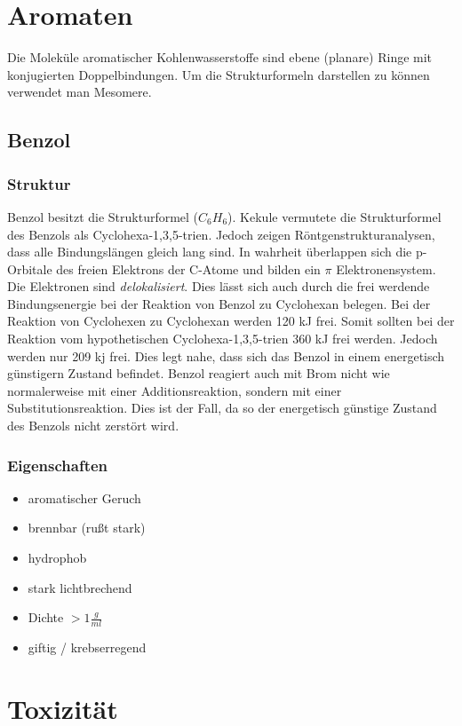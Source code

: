 \documentclass{article}
\begin{document}
\section*{Aromaten}
Die Moleküle aromatischer Kohlenwasserstoffe sind ebene (planare)
Ringe mit konjugierten Doppelbindungen. Um die Strukturformeln darstellen zu können 
verwendet man Mesomere.
\subsection*{Benzol}
\subsubsection*{Struktur}
Benzol besitzt die Strukturformel ($C_6H_6$). Kekule vermutete die Strukturformel des
Benzols als Cyclohexa-1,3,5-trien. Jedoch zeigen Röntgenstrukturanalysen, dass alle 
Bindungslängen gleich lang sind. In wahrheit überlappen sich die p-Orbitale des freien
Elektrons der C-Atome und bilden ein $\pi$ Elektronensystem. Die Elektronen sind 
\emph{delokalisiert}. Dies lässt sich auch durch die frei werdende Bindungsenergie bei
der Reaktion von Benzol zu Cyclohexan belegen. Bei der Reaktion von Cyclohexen zu 
Cyclohexan werden 120 \unit{kJ} frei. Somit sollten bei der Reaktion vom hypothetischen
Cyclohexa-1,3,5-trien 360 \unit{kJ} frei werden. Jedoch werden nur 209 \unit{kj} frei.
Dies legt nahe, dass sich das Benzol in einem energetisch günstigern Zustand befindet.
Benzol reagiert auch mit Brom nicht wie normalerweise mit einer Additionsreaktion,
sondern mit einer Substitutionsreaktion. Dies ist der Fall, da so der energetisch günstige Zustand des 
Benzols nicht zerstört wird.

\subsubsection*{Eigenschaften}
\begin{itemize}
    \item aromatischer Geruch
    \item brennbar (rußt stark)
    \item hydrophob
    \item stark lichtbrechend
    \item Dichte $ > 1 \frac{\unit{g}}{\unit{ml}} $
    \item giftig / krebserregend
\end{itemize}
\section*{Toxizität}
\end{document}

